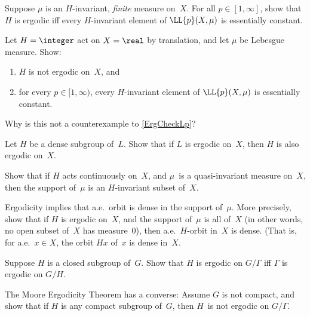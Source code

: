 \begin{exercises}
\item \label{ErgCheckLp}
Suppose $\mu$ is an $H$-invariant, \emph{finite} measure on~$X$. For all $p \in [1,\infty]$, show that $H$ is ergodic iff every $H$-invariant element of $\LL{p}(X,\mu)$ is essentially constant.

\item Let $H = \integer$ act on $X = \real$ by translation, and let $\mu$ be Lebesgue measure. Show:
	\begin{enumerate}
	\item $H$ is not ergodic on~$X$,
	and
	\item for every $p \in [1,\infty)$, every $H$-invariant element of $\LL{p}(X,\mu)$ is essentially constant.
	\end{enumerate}
Why is this not a counterexample to \cref{ErgCheckLp}?

\item Let $H$ be a dense subgroup of~$L$. Show that if $L$ is ergodic on~$X$, then $H$ is also ergodic on~$X$.

\item Show that if $H$ acts continuously on~$X$, and $\mu$~is a quasi-invariant measure on~$X$, then the support of~$\mu$ is an $H$-invariant subset of~$X$.

\item \label{AEOrbitDense}
Ergodicity implies that a.e.\ orbit is dense in the support of~$\mu$. More precisely, show that if $H$ is ergodic on~$X$, and the support of~$\mu$ is all of~$X$ (in other words, no open subset of~$X$ has measure~$0$), then a.e.\ $H$-orbit in~$X$ is dense. (That is, for a.e.\ $x \in X$, the orbit $Hx$ of~$x$ is dense in~$X$.

\item \label{MackeySwitchErgodic}
Suppose $H$ is a closed subgroup of~$G$. Show that $H$ is ergodic on $G/\Gamma$ iff $\Gamma$ is ergodic on $G/H$.

\item The Moore Ergodicity Theorem has a converse: Assume $G$ is not compact, and show that if $H$ is any compact subgroup of~$G$, then $H$~is not ergodic on $G/\Gamma$.


\end{exercises}

